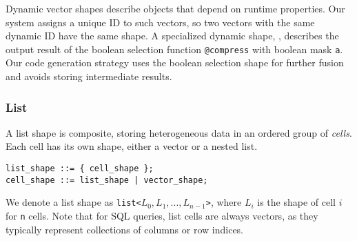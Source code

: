 Dynamic vector shapes describe objects that depend on runtime properties. Our system
assigns a unique ID to such vectors, so two vectors with the same dynamic ID have the
same shape. A specialized dynamic shape, , describes the output result
of the boolean selection function \texttt{@compress} with boolean mask \texttt{a}. Our
code generation strategy uses the boolean selection shape for further fusion and
avoids storing intermediate results.

\subsubsection{List}

A list shape is composite, storing heterogeneous data in an ordered group of
\textit{cells}. Each cell has its own shape, either a vector or a nested list.
\begin{small}
\begin{verbatim}
list_shape ::= { cell_shape };
cell_shape ::= list_shape | vector_shape;
\end{verbatim}
\end{small}
We denote a list shape as \texttt{list<$L_0,L_1,...,L_{n-1}$>}, where $L_i$
is the shape of cell $i$ for \texttt{n} cells. Note that for SQL queries,
list cells are always vectors, as they typically represent collections of columns
or row indices.




